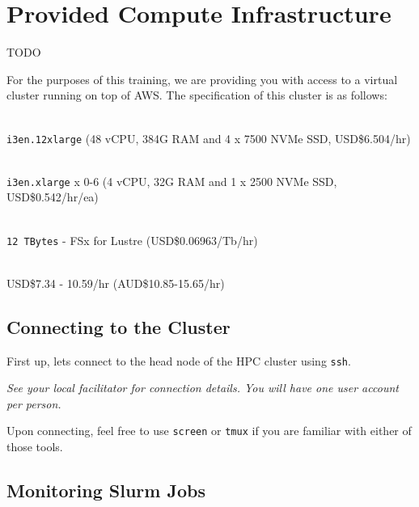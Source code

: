 \section{Provided Compute Infrastructure}

TODO

For the purposes of this training, we are providing you with access to a virtual cluster running on top of AWS.
The specification of this cluster is as follows:

\begin{description}[style=multiline,labelindent=0cm,align=left,leftmargin=0.5cm]
  \item[Head Node]\hfill\\
    \texttt{i3en.12xlarge} (48 vCPU, 384G RAM and 4 x 7500 NVMe SSD, USD\$6.504/hr)
  \item[Compute Nodes]\hfill\\
	  \texttt{i3en.xlarge} x 0-6 (4 vCPU, 32G RAM and 1 x 2500 NVMe SSD, USD\$0.542/hr/ea)
  \item[Shared Storage]\hfill\\
	  \texttt{12 TBytes} - FSx for Lustre (USD\$0.06963/Tb/hr)
  \item[Total]\hfill\\
	  USD\$7.34 - 10.59/hr (AUD\$10.85-15.65/hr)
\end{description}

\subsection{Connecting to the Cluster}

\begin{steps}
First up, lets connect to the head node of the HPC cluster using \texttt{ssh}.

\emph{See your local facilitator for connection details. You will have one user account per person.}

Upon connecting, feel free to use \texttt{screen} or \texttt{tmux} if you are familiar with either of those tools.

\end{steps}

\subsection{Monitoring Slurm Jobs}

